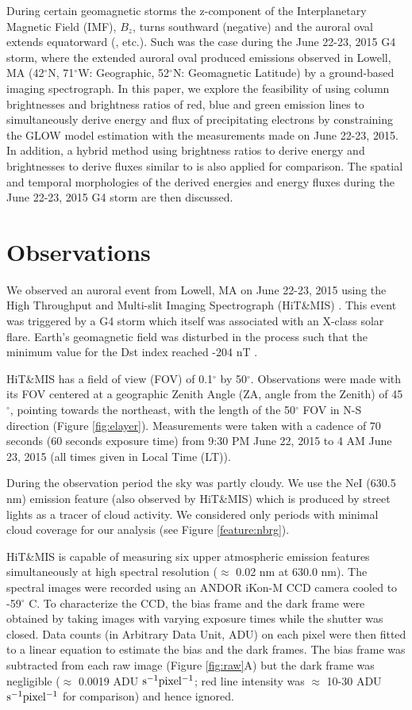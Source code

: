 During certain geomagnetic storms the z-component of the Interplanetary Magnetic Field (IMF), $B_z$, turns southward (negative) and the auroral oval extends equatorward (\citet{holzworthmeng,hardy}, etc.). Such was the case during the June 22-23, 2015 G4 storm, where the extended auroral oval produced emissions observed in Lowell, MA (42$^\circ$N, 71$^\circ$W: Geographic, 52$^\circ$N: Geomagnetic Latitude) by a ground-based imaging spectrograph. In this paper, we explore the feasibility of using column brightnesses and brightness ratios of red, blue and green emission lines to simultaneously derive energy and flux of precipitating electrons by constraining the GLOW model estimation with the measurements made on June 22-23, 2015. In addition, a hybrid method using brightness ratios to derive energy and brightnesses to derive fluxes similar to \cite{rees_1974} is also applied for comparison. The spatial and temporal morphologies of the derived energies and energy fluxes during the June 22-23, 2015 G4 storm are then discussed.

\section{Observations}
We observed an auroral event from Lowell, MA on June 22-23, 2015 using the High Throughput and Multi-slit Imaging Spectrograph (HiT\&MIS) \citep{hitmis}. This event was triggered by a G4 storm which itself was associated with an X-class solar flare. Earth's geomagnetic field was disturbed in the process such that the minimum
value for the Dst index reached -204 nT \citep{baker_dst}.

HiT\&MIS has a field of view (FOV) of 0.1$^\circ$ by 50$^\circ$. Observations were made with its FOV centered at a geographic Zenith Angle (ZA, angle from the Zenith) of 45$^\circ$, pointing towards the northeast, with the length of the 50$^\circ$ FOV in N-S direction (Figure \ref{fig:elayer}). Measurements were taken with a cadence of
70 seconds (60 seconds exposure time) from 9:30 PM  June 22, 2015 to 4 AM June 23, 2015 (all times given in Local Time (LT)). 

During the observation period the sky was partly cloudy. We use the NeI (630.5 nm) emission feature (also observed by HiT\&MIS) which is produced by street lights as a tracer of cloud activity. We considered only periods with minimal cloud coverage for our analysis (see Figure \ref{feature:nbrg}). 

HiT\&MIS is capable of measuring six upper atmospheric 
emission features simultaneously at high spectral resolution ($\approx$ 0.02 nm at 630.0 nm).
The spectral images were recorded using an ANDOR iKon-M CCD camera cooled to -59$^\circ$ C. To characterize the CCD, the bias frame and the dark frame were obtained by
taking images with varying exposure times while the shutter was closed. Data counts (in Arbitrary Data Unit, ADU) on each pixel were then fitted to a linear equation to estimate the bias and the dark frames. The bias frame was subtracted from each raw image (Figure \ref{fig:raw}A) but the dark frame was negligible ($\approx{}$ 0.0019 ADU $\rm s^{-1} pixel^{-1}$; red line intensity was $\approx$ 10-30 ADU $\rm s^{-1} pixel^{-1}$ for comparison) and hence ignored.

